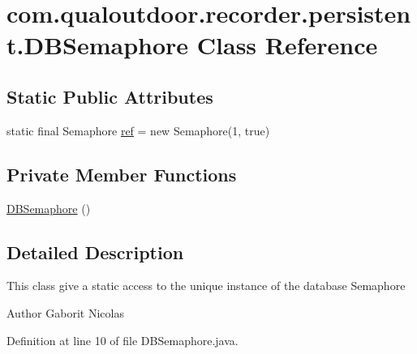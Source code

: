 \hypertarget{classcom_1_1qualoutdoor_1_1recorder_1_1persistent_1_1DBSemaphore}{\section{com.\-qualoutdoor.\-recorder.\-persistent.\-D\-B\-Semaphore Class Reference}
\label{classcom_1_1qualoutdoor_1_1recorder_1_1persistent_1_1DBSemaphore}
}
\subsection*{Static Public Attributes}
\begin{DoxyCompactItemize}
\item 
static final Semaphore \hyperlink{classcom_1_1qualoutdoor_1_1recorder_1_1persistent_1_1DBSemaphore_a3648db8b3d4c3e73ca91f1be03fe4177}{ref} = new Semaphore(1, true)
\end{DoxyCompactItemize}
\subsection*{Private Member Functions}
\begin{DoxyCompactItemize}
\item 
\hyperlink{classcom_1_1qualoutdoor_1_1recorder_1_1persistent_1_1DBSemaphore_a627955d7b63ae49fde489dcf09717769}{D\-B\-Semaphore} ()
\end{DoxyCompactItemize}


\subsection{Detailed Description}
This class give a static access to the unique instance of the database Semaphore \begin{DoxyAuthor}{Author}
Gaborit Nicolas 
\end{DoxyAuthor}


Definition at line 10 of file D\-B\-Semaphore.\-java.



